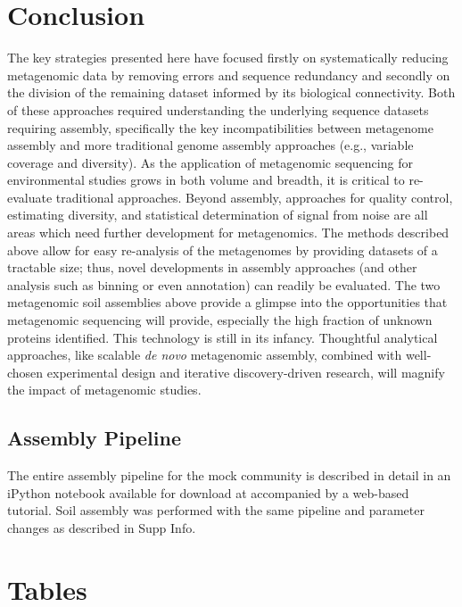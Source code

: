 \documentclass[11pt]{article} %
\begin{document}
\section{Conclusion}
The key strategies presented here have focused firstly on
systematically reducing metagenomic data by removing errors and
sequence redundancy and secondly on the division of the remaining
dataset informed by its biological connectivity.  Both of these
approaches required understanding the underlying sequence datasets
requiring assembly, specifically the key incompatibilities between metagenome
assembly
and more traditional genome assembly approaches (e.g., variable
coverage and diversity).  As the application of metagenomic sequencing
for environmental studies grows in both volume and breadth, it is
critical to re-evaluate traditional approaches.  Beyond assembly, approaches for quality
control, estimating diversity, and statistical determination of signal
from noise are all areas which need further development for
metagenomics.  The methods described above allow for easy re-analysis
of the metagenomes by providing datasets of a tractable size; thus,
novel developments in assembly approaches (and other analysis such as
binning or even annotation) can readily be evaluated.  The two
metagenomic soil assemblies above provide a glimpse into the
opportunities that metagenomic sequencing will provide, especially the
high fraction of unknown proteins identified.  This technology is
still in its infancy.  Thoughtful analytical approaches, like scalable
{\em de novo} metagenomic assembly, combined with well-chosen experimental
design and iterative discovery-driven research, will magnify the
impact of metagenomic studies.

\subsection{Assembly Pipeline}
The entire assembly pipeline for the mock community is described in
detail in an iPython notebook available for download at \cite{url2,url1}
accompanied by a web-based tutorial.  Soil assembly was performed with
the same pipeline and parameter changes as described in Supp Info.



\pagebreak

\section{Tables}
\end{document}
